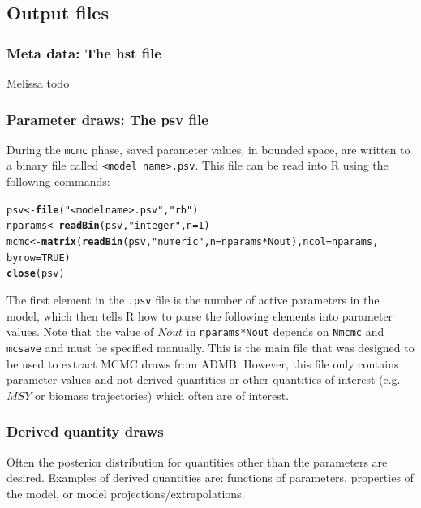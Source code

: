\documentclass{article}\usepackage[]{graphicx}\usepackage[]{color}
\makeatletter
\newcommand{\hlnum}[1]{\textcolor[rgb]{0.686,0.059,0.569}{#1}}%
\newcommand{\hlstr}[1]{\textcolor[rgb]{0.192,0.494,0.8}{#1}}%
\newcommand{\hlopt}[1]{\textcolor[rgb]{0,0,0}{#1}}%
\newcommand{\hlstd}[1]{\textcolor[rgb]{0.345,0.345,0.345}{#1}}%
\newcommand{\hlkwb}[1]{\textcolor[rgb]{0.69,0.353,0.396}{#1}}%
\newcommand{\hlkwc}[1]{\textcolor[rgb]{0.333,0.667,0.333}{#1}}%
\newcommand{\hlkwd}[1]{\textcolor[rgb]{0.737,0.353,0.396}{\textbf{#1}}}%
\newenvironment{kframe}{%
 \def\at@end@of@kframe{}%
 \ifinner\ifhmode%
  \def\at@end@of@kframe{\end{minipage}}%
  \begin{minipage}{\columnwidth}%
 \fi\fi%
 \def\FrameCommand##1{\hskip\@totalleftmargin \hskip-\fboxsep
 \colorbox{shadecolor}{##1}\hskip-\fboxsep
     \hskip-\linewidth \hskip-\@totalleftmargin \hskip\columnwidth}%
 \MakeFramed {\advance\hsize-\width
   \@totalleftmargin\z@ \linewidth\hsize
   \@setminipage}}%
 {\par\unskip\endMakeFramed%
 \at@end@of@kframe}
\newenvironment{knitrout}{}{} %
\makeatother
\begin{document}
\subsection{Output files}\label{sec:outfiles}
\subsubsection{Meta data: The hst file}
Melissa todo
\subsubsection{Parameter draws: The psv file}
During the \texttt{mcmc} phase, saved parameter values, in
bounded space, are written to a binary file called
\texttt{<model name>.psv}. This file can be read into R
using the following commands:
\begin{knitrout}
\color{fgcolor}\begin{kframe}
\begin{alltt}
\hlstd{psv} \hlkwb{<-} \hlkwd{file}\hlstd{(}\hlstr{"<model name>.psv"}\hlstd{,} \hlstr{"rb"}\hlstd{)}
\hlstd{nparams} \hlkwb{<-} \hlkwd{readBin}\hlstd{(psv,} \hlstr{"integer"}\hlstd{,} \hlkwc{n} \hlstd{=} \hlnum{1}\hlstd{)}
\hlstd{mcmc} \hlkwb{<-} \hlkwd{matrix}\hlstd{(}\hlkwd{readBin}\hlstd{(psv,} \hlstr{"numeric"}\hlstd{,} \hlkwc{n} \hlstd{= nparams} \hlopt{*} \hlstd{Nout),} \hlkwc{ncol} \hlstd{= nparams,}
    \hlkwc{byrow} \hlstd{=} \hlnum{TRUE}\hlstd{)}
\hlkwd{close}\hlstd{(psv)}
\end{alltt}
\end{kframe}
\end{knitrout}

The first element in the \texttt{.psv} file is the number of
active parameters in the model, which then tells R how to
parse the following elements into parameter values. Note
that the value of $Nout$ in \texttt{nparams*Nout} depends on
\texttt{Nmcmc} and \texttt{mcsave} and must be specified
manually. This is the main file that was designed to be used
to extract MCMC draws from ADMB. However, this file only
contains parameter values and not derived quantities or
other quantities of interest (e.g. $MSY$ or biomass
trajectories) which often are of interest.
\subsubsection{Derived quantity draws}
Often the posterior distribution for quantities other than
the parameters are desired. Examples of derived quantities
are: functions of parameters, properties of the model, or
model projections/extrapolations.
\end{document}
